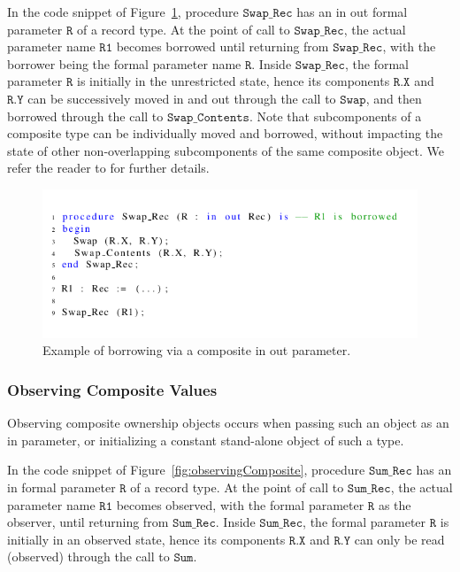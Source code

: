 \documentclass{llncs}
\newcommand\var[1]{\ensuremath{\mathtt{#1}}}
\newcommand{\keyword}[1]{\textsf{#1}}
\begin{document}
In the code snippet of Figure~\ref{fig:borrowingComposite}, procedure \var{Swap\_Rec} has an \keyword{in out} formal parameter \var{R} of a record type. At the point of
call to \var{Swap\_Rec}, the actual parameter name \var{R1} becomes borrowed until returning from \var{Swap\_Rec}, with the borrower being the formal parameter name \var{R}.  Inside \var{Swap\_Rec}, the formal parameter \var{R} is initially
in the unrestricted state, hence its components \var{R.X} and \var{R.Y} can be successively moved in and out through the call to \var{Swap}, and then borrowed through the call to \var{Swap\_Contents}.
Note that subcomponents of a composite type can be individually moved and borrowed, without impacting the state of other non-overlapping subcomponents of the same composite object.
We refer the reader to \cite{AI2018} for further details.

\begin{figure}[htb!]
\centering
   \includegraphics[]{borrowingComposite}
   \caption{Example of borrowing via a composite \keyword{in out} parameter.}
   \label{fig:borrowingComposite}
\end{figure}

   
\subsubsection{Observing Composite Values}
\label{subsubsec:extendingBorrowing}

Observing composite ownership objects occurs when passing such an object as an \keyword{in} parameter, or initializing a constant stand-alone object of such a type. 

In the code snippet of Figure~\ref{fig:observingComposite}, procedure \var{Sum\_Rec} has an \keyword{in} formal parameter \var{R} of a record type.
At the point of call to \var{Sum\_Rec}, the actual parameter name \var{R1} becomes observed, with the formal parameter \var{R} as the observer, until returning from \var{Sum\_Rec}. Inside \var{Sum\_Rec},
the formal parameter \var{R} is initially in an observed state, hence its components \var{R.X} and \var{R.Y} can only be read (observed) through the call to \var{Sum}.
\end{document}

